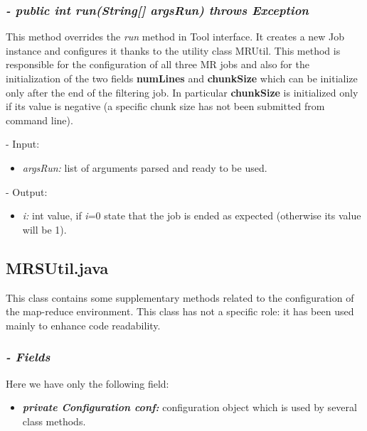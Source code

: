 \documentclass[]{report}
\begin{document}
	\subsubsection*{\textit{\textbf{-} public int run(String[] argsRun) throws Exception}}   	
  	This method overrides the \textit{run} method in Tool interface. It creates a new Job instance and configures it thanks to the utility class MRUtil. This method is responsible for the configuration of all three MR jobs and also for the initialization of the two fields \textbf{numLines} and \textbf{chunkSize} which can be initialize only after the end of the filtering job. In particular \textbf{chunkSize} is initialized only if its value is negative (a specific chunk size has not been submitted from command line).  
	\begin{description}
		\item - Input:
		\begin{itemize}
			\item \textit{argsRun:} list of arguments parsed and ready to be used.
		\end{itemize}
	\end{description}
	\begin{description}
		\item - Output:
		\begin{itemize}
			\item \textit{i:} int value, if \textit{i}=0 state that the job is ended as expected (otherwise its value will be 1). 
		\end{itemize}
	\end{description}
	\vskip 20pt
	\subsection*{MRSUtil.java}
	This class contains some supplementary methods related to the configuration of the map-reduce environment. This class has not a specific role: it has been used mainly to enhance code readability.
	
	\subsubsection*{\textit{\textbf{-} Fields}} 
	Here we have only the following field:
	\begin{itemize}
		\item \textit{\textbf{private Configuration conf:}} configuration object which is used by several class methods. 
	\end{itemize}
\end{document}
